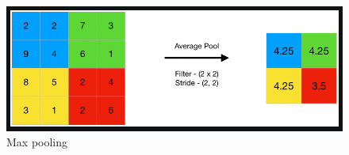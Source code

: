 \begin{figure}[H]
    \begin{center}
        \includegraphics[width=.5\textwidth]{./chapters/4_deep_learning/3_types_of_neural_networks/images/02_pooling_average.png}
    \end{center}
    \caption{Max pooling}
    \label{fig:02_pooling_average}
\end{figure}

